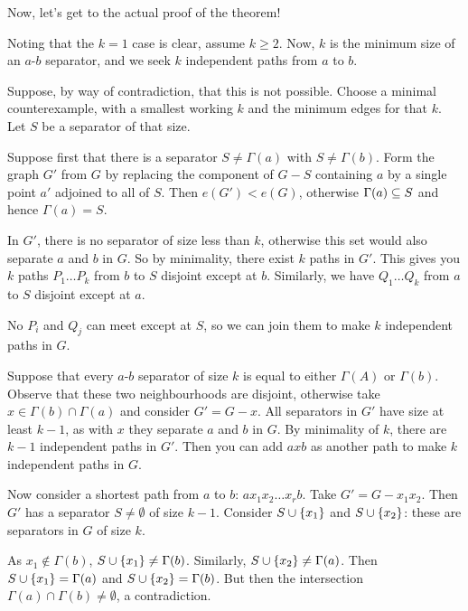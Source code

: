 \documentclass{article}
\begin{document}
Now, let's get to the actual proof of the theorem!
    
\begin{prf}
    Noting that the $k = 1$ case is clear, assume $k \geq 2$. Now, $k$ is the minimum size of an $a$-$b$ separator, and we seek $k$ independent paths from $a$ to $b$.
    
    Suppose, by way of contradiction, that this is not possible. Choose a minimal counterexample, with a smallest working $k$ and the minimum edges for that $k$. Let $S$ be a separator of that size.
    
    Suppose first that there is a separator $S \neq \Gamma(a)$ with $S \neq \Gamma(b)$. Form the graph $G'$ from $G$ by replacing the component of $G-S$ containing $a$ by a single point $a'$ adjoined to all of $S$. Then $e(G') < e(G)$, otherwise $\Gamma(a) \subseteq S$ and hence $\Gamma(a) = S$.
    
    In $G'$, there is no separator of size less than $k$, otherwise this set would also separate $a$ and $b$ in $G$. So by minimality, there exist $k$ paths in $G'$. This gives you $k$ paths $P_1 \dots P_k$ from $b$ to $S$ disjoint except at $b$. Similarly, we have $Q_1 \dots Q_k$ from $a$ to $S$ disjoint except at $a$.
    
    No $P_i$ and $Q_j$ can meet except at $S$, so we can join them to make $k$ independent paths in $G$.
    
    Suppose that every $a$-$b$ separator of size $k$ is equal to either $\Gamma(A)$ or $\Gamma(b)$. Observe that these two neighbourhoods are disjoint, otherwise take $x \in \Gamma(b) \cap \Gamma(a)$ and consider $G' = G - x$. All separators in $G'$ have size at least $k-1$, as with $x$ they separate $a$ and $b$ in $G$. By minimality of $k$, there are $k-1$ independent paths in $G'$. Then you can add $axb$ as another path to make $k$ independent paths in $G$.
    
    Now consider a shortest path from $a$ to $b$: $a x_1 x_2 \dots x_r b$. Take $G' = G - x_1 x_2$. Then $G'$ has a separator $S \neq \emptyset$ of size $k-1$. Consider $S \cup \left\lbrace x_1 \right\rbrace$ and $S \cup \left\lbrace x_2 \right\rbrace$: these are separators in $G$ of size $k$.
    
    As $x_1 \notin \Gamma(b)$, $S \cup \left\lbrace x_1 \right\rbrace \neq \Gamma(b)$. Similarly, $S \cup \left\lbrace x_2 \right\rbrace \neq \Gamma(a)$. Then $S \cup \left\lbrace x_1 \right\rbrace = \Gamma(a)$ and $S \cup \left\lbrace x_2 \right\rbrace = \Gamma(b)$. But then the intersection $\Gamma(a) \cap \Gamma(b) \neq \emptyset$, a contradiction.
\end{prf}
\end{document}
